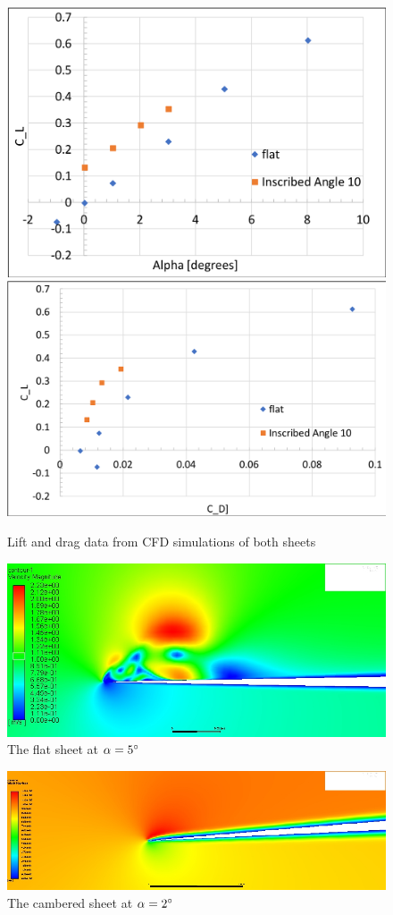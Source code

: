 \documentclass[12pt]{report} %
\begin{document}
\begin{figure}
\includegraphics[width = 0.47\linewidth]{lift.png}
\includegraphics[width = 0.53\linewidth]{polar.png}
\caption{Lift and drag data from CFD simulations of both sheets}
\label{cfd_polar}
\end{figure}

\begin{figure}
\includegraphics[width = \linewidth]{flat.jpg}
\caption{The flat sheet at $\alpha = 5\degree$}
\label{flat_velocity}
\end{figure}

\begin{figure}
\includegraphics[width = \linewidth]{alpha2.jpg}
\caption{The cambered sheet at $\alpha = 2\degree$}
\label{cambered_velocity}
\end{figure}
\end{document}
